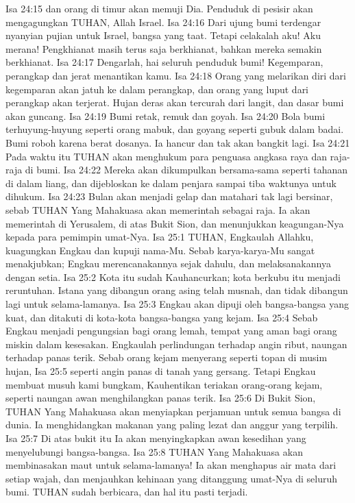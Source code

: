 Isa 24:15  dan orang di timur akan memuji Dia. Penduduk di pesisir akan mengagungkan TUHAN, Allah Israel.
Isa 24:16  Dari ujung bumi terdengar nyanyian pujian untuk Israel, bangsa yang taat. Tetapi celakalah aku! Aku merana! Pengkhianat masih terus saja berkhianat, bahkan mereka semakin berkhianat.
Isa 24:17  Dengarlah, hai seluruh penduduk bumi! Kegemparan, perangkap dan jerat menantikan kamu.
Isa 24:18  Orang yang melarikan diri dari kegemparan akan jatuh ke dalam perangkap, dan orang yang luput dari perangkap akan terjerat. Hujan deras akan tercurah dari langit, dan dasar bumi akan guncang.
Isa 24:19  Bumi retak, remuk dan goyah.
Isa 24:20  Bola bumi terhuyung-huyung seperti orang mabuk, dan goyang seperti gubuk dalam badai. Bumi roboh karena berat dosanya. Ia hancur dan tak akan bangkit lagi.
Isa 24:21  Pada waktu itu TUHAN akan menghukum para penguasa angkasa raya dan raja-raja di bumi.
Isa 24:22  Mereka akan dikumpulkan bersama-sama seperti tahanan di dalam liang, dan dijebloskan ke dalam penjara sampai tiba waktunya untuk dihukum.
Isa 24:23  Bulan akan menjadi gelap dan matahari tak lagi bersinar, sebab TUHAN Yang Mahakuasa akan memerintah sebagai raja. Ia akan memerintah di Yerusalem, di atas Bukit Sion, dan menunjukkan keagungan-Nya kepada para pemimpin umat-Nya.
Isa 25:1  TUHAN, Engkaulah Allahku, kuagungkan Engkau dan kupuji nama-Mu. Sebab karya-karya-Mu sangat menakjubkan; Engkau merencanakannya sejak dahulu, dan melaksanakannya dengan setia.
Isa 25:2  Kota itu sudah Kauhancurkan; kota berkubu itu menjadi reruntuhan. Istana yang dibangun orang asing telah musnah, dan tidak dibangun lagi untuk selama-lamanya.
Isa 25:3  Engkau akan dipuji oleh bangsa-bangsa yang kuat, dan ditakuti di kota-kota bangsa-bangsa yang kejam.
Isa 25:4  Sebab Engkau menjadi pengungsian bagi orang lemah, tempat yang aman bagi orang miskin dalam kesesakan. Engkaulah perlindungan terhadap angin ribut, naungan terhadap panas terik. Sebab orang kejam menyerang seperti topan di musim hujan,
Isa 25:5  seperti angin panas di tanah yang gersang. Tetapi Engkau membuat musuh kami bungkam, Kauhentikan teriakan orang-orang kejam, seperti naungan awan menghilangkan panas terik.
Isa 25:6  Di Bukit Sion, TUHAN Yang Mahakuasa akan menyiapkan perjamuan untuk semua bangsa di dunia. Ia menghidangkan makanan yang paling lezat dan anggur yang terpilih.
Isa 25:7  Di atas bukit itu Ia akan menyingkapkan awan kesedihan yang menyelubungi bangsa-bangsa.
Isa 25:8  TUHAN Yang Mahakuasa akan membinasakan maut untuk selama-lamanya! Ia akan menghapus air mata dari setiap wajah, dan menjauhkan kehinaan yang ditanggung umat-Nya di seluruh bumi. TUHAN sudah berbicara, dan hal itu pasti terjadi.

